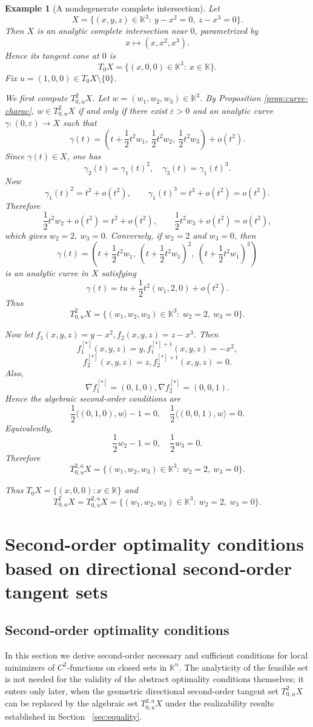 \documentclass[10pt,reqno]{amsart}
\theoremstyle{break-italic}
\theoremstyle{break-italic}
\theoremstyle{break-italic}
\theoremstyle{break-italic}
\theoremstyle{break-italic}
\theoremstyle{break-italic}
\theoremstyle{break-italic}
\theoremstyle{break-italic}
\theoremstyle{break-roman}
\newtheorem{example}[satz]{Example}
\theoremstyle{standard}
\theoremstyle{varthm-roman}
\theoremstyle{varthm-italic}
\theoremstyle{varthm-roman-break}
\theoremstyle{varthm-italic-break}
\theoremstyle{varthm-roman-no-punctuation}
\theoremstyle{varthm-italic-no-punctuation}
\numberwithin{equation}{section}
\begin{document}
\begin{example}[A nondegenerate complete intersection]\label{ex:complete-intersection}
Let
\[
X=\{(x,y,z)\in \mathbb K^3:\ y-x^2=0,\ z-x^3=0\}.
\]
Then $X$ is an analytic complete intersection near $0$, parametrized by
\[
x\longmapsto (x,x^2,x^3).
\]
Hence its tangent cone at $0$ is
\[
T_0X=\{(x,0,0)\in \mathbb K^3:\ x\in\mathbb K\}.
\]
Fix
\(
u=(1,0,0)\in T_0X\setminus\{0\}.
\)

We first compute $T^2_{0,u}X$. Let $w=(w_1,w_2,w_3)\in \mathbb K^3$. By
Proposition \ref{prop:curve-charac}, $w\in T^2_{0,u}X$ if and only if there
exist $\varepsilon>0$ and an analytic curve
\(
\gamma:(0,\varepsilon)\to X
\)
such that
\[
\gamma(t)=\left(t+\frac12 t^2w_1,\ \frac12 t^2w_2,\ \frac12 t^2w_3\right)+o(t^2).
\]
Since $\gamma(t)\in X$, one has
\[
\gamma_2(t)=\gamma_1(t)^2,
\quad
\gamma_3(t)=\gamma_1(t)^3.
\]
Now
\[
\gamma_1(t)^2=t^2+o(t^2),
\qquad
\gamma_1(t)^3=t^3+o(t^2)=o(t^2).
\]
Therefore
\[
\frac12 t^2w_2+o(t^2)=t^2+o(t^2),
\qquad
\frac12 t^2w_3+o(t^2)=o(t^2),
\]
which gives
\(
w_2=2,~ w_3=0.
\)
Conversely, if $w_2=2$ and $w_3=0$, then
\[
\gamma(t)=\left(t+\frac12 t^2w_1,\ \left(t+\frac12 t^2w_1\right)^2,\ \left(t+\frac12 t^2w_1\right)^3\right)
\]
is an analytic curve in $X$ satisfying
\[
\gamma(t)=tu+\frac12 t^2(w_1,2,0)+o(t^2).
\]
Thus
\[
T^2_{0,u}X=\{(w_1,w_2,w_3)\in \mathbb K^3:\ w_2=2,\ w_3=0\}.
\]

Now let
\(
f_1(x,y,z)=y-x^2, f_2(x,y,z)=z-x^3.
\)
Then
\[
f_1^{[\ast]}(x,y,z)=y, f_1^{[\ast]+1}(x,y,z)=-x^2,
\]
\[
f_2^{[\ast]}(x,y,z)=z, f_2^{[\ast]+1}(x,y,z)=0.
\]
Also,
\[
\nabla f_1^{[\ast]}=(0,1,0), \nabla f_2^{[\ast]}=(0,0,1).
\]
Hence the algebraic second-order conditions are
\[
\frac12\langle (0,1,0),w\rangle -1=0,
\quad
\frac12\langle (0,0,1),w\rangle =0.
\]
Equivalently,
\[
\frac12 w_2-1=0,
\quad
\frac12 w_3=0.
\]
Therefore
\[
T^{2,a}_{0,u}X
=
\{(w_1,w_2,w_3)\in \mathbb K^3:\ w_2=2,\ w_3=0\}.
\]

Thus
\(
T_0X=\{(x,0,0):x\in\mathbb K\}
\) and 
\[
T^2_{0,u}X=T^{2,a}_{0,u}X=\{(w_1,w_2,w_3)\in\mathbb K^3:\ w_2=2,\ w_3=0\}.
\]
\end{example}



\section{Second-order optimality conditions based on directional second-order tangent sets} \label{sec:optimization}
\subsection{Second-order optimality conditions}
In this section we derive second-order necessary and sufficient conditions for
local minimizers of $C^2$-functions on closed sets in $\mathbb K^n$. The
analyticity of the feasible set is not needed for the validity of the abstract
optimality conditions themselves; it enters only later, when the geometric
directional second-order tangent set $T^2_{0,u}X$ can be replaced by the
algebraic set $T^{2,a}_{0,u}X$ under the realizability results established in
Section~ \ref{sec:equality}.
\end{document}
